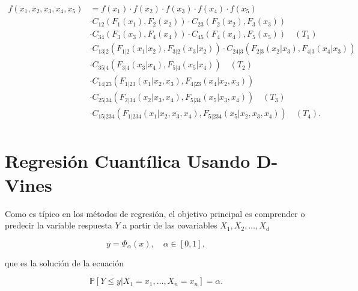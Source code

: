 \vspace{-0.5cm}
\begin{equation}\label{distC5}
     \begin{split}
         f(x_1, x_2, x_3, x_4, x_5) & = f(x_1) \cdot f(x_2) \cdot f(x_3) \cdot f(x_4) \cdot f(x_5)  \\
         & \cdot C_{12}(F_1(x_1), F_2(x_2)) \cdot C_{23}(F_2(x_2), F_3(x_3)) \\
         & \cdot C_{34}(F_3(x_3), F_4(x_4)) \cdot C_{45}(F_4(x_4), F_5(x_5)) \quad (T_1)\\
         & \cdot C_{13|2}(F_{1|2}(x_1|x_2), F_{3|2}(x_3|x_2)) \cdot C_{24|3}(F_{2|3}(x_2|x_3), F_{4|3}(x_4|x_3))\\
         &\cdot C_{35|4}(F_{3|4}(x_3|x_4), F_{5|4}(x_5|x_4)) \quad (T_2)\\
         & \cdot C_{14|23}(F_{1|23}(x_1|x_2, x_3), F_{4|23}(x_4|x_2, x_3)) \\
         & \cdot C_{25|34}(F_{2|34}(x_2|x_3, x_4), F_{5|34}(x_5|x_3, x_4)) \quad (T_3)\\
         & \cdot C_{15|234}(F_{1|234}(x_1|x_2, x_3, x_4), F_{5|234}(x_5|x_2, x_3, x_4)) \quad (T_4).\\
     \end{split}
\end{equation}

\section{Regresión Cuantílica Usando D-Vines}

Como es típico en los métodos de regresión, el objetivo principal es comprender o predecir la variable respuesta $Y$ a partir de las covariables $X_1, X_2, \dots , X_d$

\vspace{-0.5cm}
\begin{equation}\label{regresion}
    y = \Phi_{\alpha}(x), \quad \alpha \in [0, 1],
\end{equation}

que es la solución de la ecuación 

\vspace{-0.5cm}
\begin{equation}
     \mathbb{P}[Y \leq y | X_1 = x_1, \dots, X_n = x_n ] = \alpha.
\end{equation}

